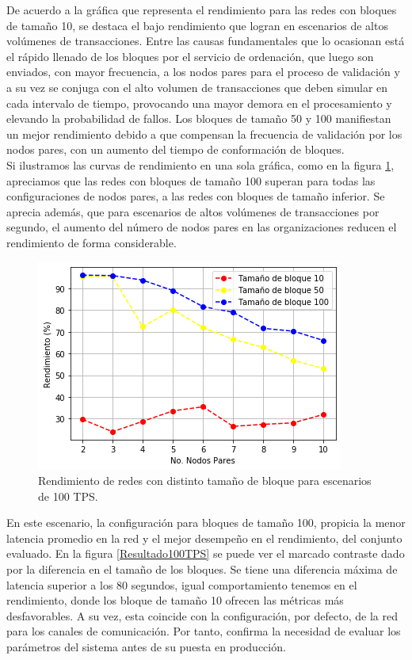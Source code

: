 De acuerdo a la gr\'afica que representa el rendimiento para las redes con bloques de tama\~no 10, se destaca el bajo rendimiento que logran en escenarios de altos vol\'umenes de transacciones. Entre las causas fundamentales que lo ocasionan est\'a el r\'apido llenado de los bloques por el servicio de ordenaci\'on, que luego son enviados, con mayor frecuencia, a los nodos pares para el proceso de validaci\'on y a su vez se conjuga con el alto volumen de transacciones que deben simular en cada intervalo de tiempo, provocando una mayor demora en el procesamiento y elevando la probabilidad de fallos. Los bloques de tama\~no 50 y 100 manifiestan un mejor rendimiento debido a que compensan la frecuencia de validaci\'on por los nodos pares, con un aumento del tiempo de conformaci\'on de bloques.\\

Si ilustramos las curvas de rendimiento en una sola gr\'afica, como en la figura \ref{RendimientoPares100TPS}, apreciamos que las redes con bloques de tama\~no 100 superan para todas las configuraciones de nodos pares, a las redes con bloques de tama\~no inferior. Se aprecia adem\'as, que para escenarios de altos vol\'umenes de transacciones por segundo, el aumento del n\'umero de nodos pares en las organizaciones reducen el rendimiento de forma considerable.

\begin{figure}[h]
\centering
\includegraphics[scale=0.5]{Graphics/RendimientoPares100TPS.png}
\caption{Rendimiento de redes con distinto tama\~no de bloque para escenarios de 100 TPS.}
\label{RendimientoPares100TPS}
\end{figure}

\newpage

En este escenario, la configuraci\'on para bloques de tama\~no 100, propicia la menor latencia promedio en la red y el mejor desempe\~no en el rendimiento, del conjunto evaluado. En la figura \ref{Resultado100TPS} se puede ver el marcado contraste dado por la diferencia en el tama\~no de los bloques. Se tiene una diferencia m\'axima de latencia superior a los 80 segundos, igual comportamiento tenemos en el rendimiento, donde los bloque de tama\~no 10 ofrecen las m\'etricas m\'as desfavorables. A su vez, esta coincide con la configuraci\'on, por defecto, de la red para los canales de comunicaci\'on. Por tanto, confirma la necesidad de evaluar los par\'ametros del sistema antes de su puesta en producci\'on.\\

